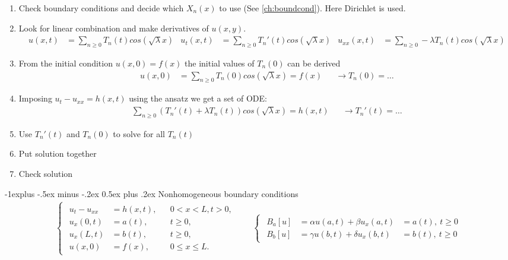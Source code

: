 \documentclass[10pt,landscape]{scrartcl}
\makeatletter
\renewcommand{\subsection}{\@startsection{subsection}{2}{0mm}%
                                {-1explus -.5ex minus -.2ex}%
                                {0.5ex plus .2ex}%
                                {\normalfont\normalsize\bfseries}}
\makeatother
\begin{document}
\begin{multicols*}{2}
  \begin{enumerate}
    \item Check boundary conditions and decide which $X_n(x)$ to use (See \ref{ch:boundcond}). Here Dirichlet is used.
    \item Look for linear combination and make derivatives of $u(x,y)$.
      \begin{align*}
        u(x,t) &= \sum_{n\geq0} T_n(t)cos(\sqrt{\lambda}x) & u_t(x,t) &= \sum_{n\geq0} T_n'(t)cos(\sqrt{\lambda}x) & u_{xx}(x,t) &= \sum_{n\geq0} -\lambda T_n(t)cos(\sqrt{\lambda}x)
      \end{align*}
    \item From the initial condition $u(x,0)=f(x)$ the initial values of $T_n(0)$ can be derived
      \begin{align*}
        u(x,0) &= \sum_{n\geq0} T_n(0)cos(\sqrt{\lambda}x) = f(x) & &\longrightarrow T_n(0)=\dots
      \end{align*}
    \item Imposing $u_t-u_{xx} = h(x,t)$ using the ansatz we get a set of ODE:
      \begin{align*}
        \sum_{n\geq0} (T_n'(t)+\lambda T_n(t) ) cos(\sqrt{\lambda}x) = h(x,t) & &\longrightarrow T_n'(t)=\dots
      \end{align*}
    \item Use $T_n'(t)$ and $T_n(0)$ to solve for all $T_n(t)$
    \item Put solution together
    \item Check solution
  \end{enumerate}

\subsection{Nonhomogeneous boundary conditions}
  \begin{align*}
    \begin{cases}
      \begin{aligned}
        u_t - u_{xx} &= h(x,t), & &0<x<L, t>0,\\
        u_x(0,t) &= a(t),     & &t\geq0,\\
        u_x(L,t) &= b(t),     & &t\geq0,\\
        u(x,0)  &= f(x),          & &0\leq x\leq L.
      \end{aligned}
    \end{cases}
    &&
    \begin{cases}
      \begin{aligned}
        B_a[u]&=\alpha u(a,t)+\beta  u_x(a,t)&=a(t),\ t\geq0 \\ 
        B_b[u]&=\gamma u(b,t)+\delta u_x(b,t)&=b(t),\ t\geq0
      \end{aligned}
    \end{cases}
  \end{align*}


\end{multicols*}
\end{document}
